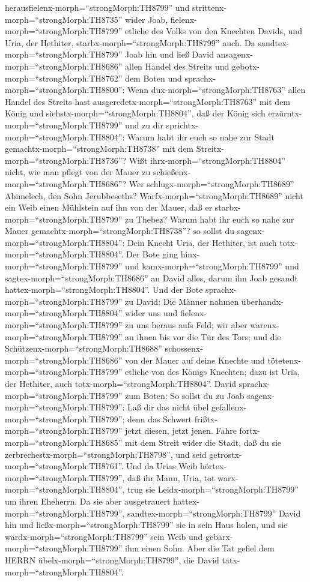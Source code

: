 herausfielenx-morph=``strongMorph:TH8799'' und
strittenx-morph=``strongMorph:TH8735'' wider Joab,
fielenx-morph=``strongMorph:TH8799'' etliche des Volks von den Knechten
Davids, und Uria, der Hethiter, starbx-morph=``strongMorph:TH8799''
auch.  Da sandtex-morph=``strongMorph:TH8799'' Joab hin und
ließ David ansagenx-morph=``strongMorph:TH8686'' allen Handel des
Streits  und gebotx-morph=``strongMorph:TH8762'' dem Boten
und sprachx-morph=``strongMorph:TH8800'': Wenn
dux-morph=``strongMorph:TH8763'' allen Handel des Streits hast
ausgeredetx-morph=``strongMorph:TH8763'' mit dem König  und
siehstx-morph=``strongMorph:TH8804'', daß der König sich
erzürntx-morph=``strongMorph:TH8799'' und zu dir
sprichtx-morph=``strongMorph:TH8804'': Warum habt ihr euch so nahe zur
Stadt gemachtx-morph=``strongMorph:TH8738'' mit dem
Streitx-morph=``strongMorph:TH8736''? Wißt
ihrx-morph=``strongMorph:TH8804'' nicht, wie man pflegt von der Mauer zu
schießenx-morph=``strongMorph:TH8686''?  Wer
schlugx-morph=``strongMorph:TH8689'' Abimelech, den Sohn Jerubbeseths?
Warfx-morph=``strongMorph:TH8689'' nicht ein Weib einen Mühlstein auf
ihn von der Mauer, daß er starbx-morph=``strongMorph:TH8799'' zu Thebez?
Warum habt ihr euch so nahe zur Mauer
gemachtx-morph=``strongMorph:TH8738''? so sollst du
sagenx-morph=``strongMorph:TH8804'': Dein Knecht Uria, der Hethiter, ist
auch totx-morph=``strongMorph:TH8804''.  Der Bote ging
hinx-morph=``strongMorph:TH8799'' und kamx-morph=``strongMorph:TH8799''
und sagtex-morph=``strongMorph:TH8686'' an David alles, darum ihn Joab
gesandt hattex-morph=``strongMorph:TH8804''.  Und der Bote
sprachx-morph=``strongMorph:TH8799'' zu David: Die Männer nahmen
überhandx-morph=``strongMorph:TH8804'' wider uns und
fielenx-morph=``strongMorph:TH8799'' zu uns heraus aufs Feld; wir aber
warenx-morph=``strongMorph:TH8799'' an ihnen bis vor die Tür des Tors;
 und die Schützenx-morph=``strongMorph:TH8688''
schossenx-morph=``strongMorph:TH8686'' von der Mauer auf deine Knechte
und tötetenx-morph=``strongMorph:TH8799'' etliche von des Königs
Knechten; dazu ist Uria, der Hethiter, auch
totx-morph=``strongMorph:TH8804''.  David
sprachx-morph=``strongMorph:TH8799'' zum Boten: So sollst du zu Joab
sagenx-morph=``strongMorph:TH8799'': Laß dir das nicht übel
gefallenx-morph=``strongMorph:TH8799''; denn das Schwert
frißtx-morph=``strongMorph:TH8799'' jetzt diesen, jetzt jenen. Fahre
fortx-morph=``strongMorph:TH8685'' mit dem Streit wider die Stadt, daß
du sie zerbrechestx-morph=``strongMorph:TH8798'', und seid
getrostx-morph=``strongMorph:TH8761''.  Und da Urias Weib
hörtex-morph=``strongMorph:TH8799'', daß ihr Mann, Uria, tot
warx-morph=``strongMorph:TH8804'', trug sie
Leidx-morph=``strongMorph:TH8799'' um ihren Eheherrn.  Da
sie aber ausgetrauert hattex-morph=``strongMorph:TH8799'',
sandtex-morph=``strongMorph:TH8799'' David hin und
ließx-morph=``strongMorph:TH8799'' sie in sein Haus holen, und sie
wardx-morph=``strongMorph:TH8799'' sein Weib und
gebarx-morph=``strongMorph:TH8799'' ihm einen Sohn. Aber die Tat gefiel
dem HERRN übelx-morph=``strongMorph:TH8799'', die David
tatx-morph=``strongMorph:TH8804''.

